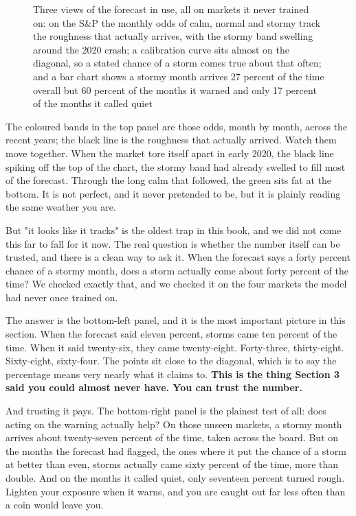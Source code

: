 \documentclass[11pt]{article} %
\begin{document}
\begin{figure}[htbp]
\centering

\caption{Three views of the forecast in use, all on markets it never trained on: on the S\&P the monthly odds of calm, normal and stormy track the roughness that actually arrives, with the stormy band swelling around the 2020 crash; a calibration curve sits almost on the diagonal, so a stated chance of a storm comes true about that often; and a bar chart shows a stormy month arrives 27 percent of the time overall but 60 percent of the months it warned and only 17 percent of the months it called quiet}
\end{figure}


The coloured bands in the top panel are those odds, month by month, across the recent years; the black line is the roughness that actually arrived. Watch them move together. When the market tore itself apart in early 2020, the black line spiking off the top of the chart, the stormy band had already swelled to fill most of the forecast. Through the long calm that followed, the green sits fat at the bottom. It is not perfect, and it never pretended to be, but it is plainly reading the same weather you are.

But "it looks like it tracks" is the oldest trap in this book, and we did not come this far to fall for it now. The real question is whether the number itself can be trusted, and there is a clean way to ask it. When the forecast says a forty percent chance of a stormy month, does a storm actually come about forty percent of the time? We checked exactly that, and we checked it on the four markets the model had never once trained on.

The answer is the bottom-left panel, and it is the most important picture in this section. When the forecast said eleven percent, storms came ten percent of the time. When it said twenty-six, they came twenty-eight. Forty-three, thirty-eight. Sixty-eight, sixty-four. The points sit close to the diagonal, which is to say the percentage means very nearly what it claims to. \textbf{This is the thing Section 3 said you could almost never have. You can trust the number.}

And trusting it pays. The bottom-right panel is the plainest test of all: does acting on the warning actually help? On those unseen markets, a stormy month arrives about twenty-seven percent of the time, taken across the board. But on the months the forecast had flagged, the ones where it put the chance of a storm at better than even, storms actually came sixty percent of the time, more than double. And on the months it called quiet, only seventeen percent turned rough. Lighten your exposure when it warns, and you are caught out far less often than a coin would leave you.
\end{document}
